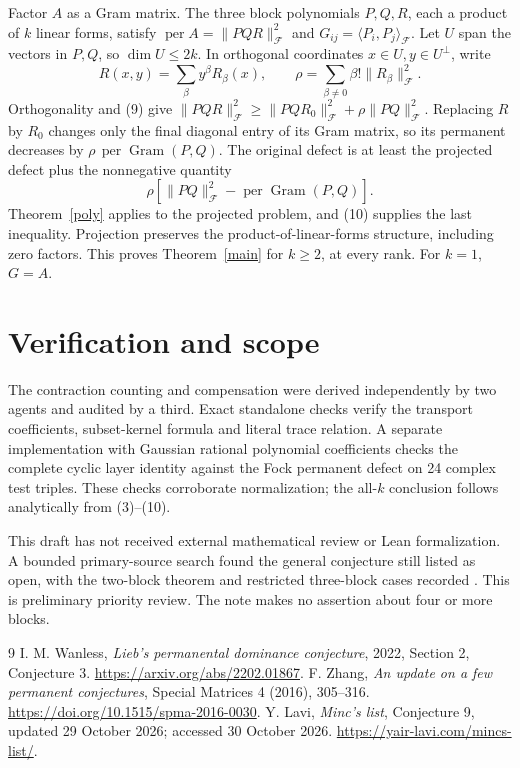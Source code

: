 \documentclass[11pt]{article}
\newcommand{\per}{\operatorname{per}}
\newcommand{\Fock}{\mathcal F}
\begin{document}
Factor \(A\) as a Gram matrix. The three block polynomials \(P,Q,R\), each a product of \(k\) linear forms, satisfy
\(\per A=\|PQR\|_{\Fock}^2\) and \(G_{ij}=\langle P_i,P_j\rangle_{\Fock}\).
Let \(U\) span the vectors in \(P,Q\), so \(\dim U\le2k\).
In orthogonal coordinates \(x\in U,y\in U^\perp\), write
\[
 R(x,y)=\sum_\beta y^\beta R_\beta(x),\qquad
 \rho=\sum_{\beta\ne0}\beta!\|R_\beta\|_{\Fock}^2.
\]
Orthogonality and (9) give
\(\|PQR\|_{\Fock}^2\ge\|PQR_0\|_{\Fock}^2+\rho\|PQ\|_{\Fock}^2\).
Replacing \(R\) by \(R_0\) changes only the final diagonal entry of its Gram matrix, so its permanent decreases by
\(\rho\,\per\operatorname{Gram}(P,Q)\).
The original defect is at least the projected defect plus the nonnegative quantity
\[
            \rho[\|PQ\|_{\Fock}^2-\per\operatorname{Gram}(P,Q)].
\]
Theorem~\ref{poly} applies to the projected problem, and (10) supplies the last inequality. Projection preserves the product-of-linear-forms structure, including zero factors. This proves Theorem~\ref{main} for \(k\ge2\), at every rank. For \(k=1\), \(G=A\).

\section*{Verification and scope}
The contraction counting and compensation were derived independently by two agents and audited by a third. Exact standalone checks verify the transport coefficients, subset-kernel formula and literal trace relation. A separate implementation with Gaussian rational polynomial coefficients checks the complete cyclic layer identity against the Fock permanent defect on 24 complex test triples. These checks corroborate normalization; the all-\(k\) conclusion follows analytically from (3)--(10).

This draft has not received external mathematical review or Lean formalization. A bounded primary-source search found the general conjecture still listed as open, with the two-block theorem and restricted three-block cases recorded \cite{wanless,lavi}. This is preliminary priority review. The note makes no assertion about four or more blocks.

\begin{thebibliography}{9}
 I. M. Wanless, \emph{Lieb's permanental dominance conjecture}, 2022, Section 2, Conjecture 3. \url{https://arxiv.org/abs/2202.01867}.
 F. Zhang, \emph{An update on a few permanent conjectures}, Special Matrices 4 (2016), 305--316. \url{https://doi.org/10.1515/spma-2016-0030}.
 Y. Lavi, \emph{Minc's list}, Conjecture 9, updated 29 October 2026; accessed 30 October 2026. \url{https://yair-lavi.com/mincs-list/}.
\end{thebibliography}
\end{document}
